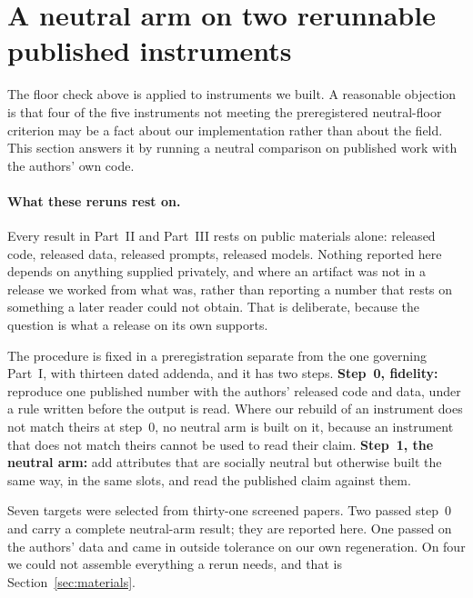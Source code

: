 
\section{A neutral arm on two rerunnable published instruments}

The floor check above is applied to instruments we built. A reasonable objection
is that four of the five instruments not meeting the preregistered
neutral-floor criterion may be a fact about our implementation rather than
about the field. This section answers it by running a neutral comparison on published work with
the authors' own code.

\paragraph{What these reruns rest on.} Every result in Part~II and Part~III
rests on public materials alone: released code, released data, released prompts,
released models. Nothing reported here depends on anything supplied privately,
and where an artifact was not in a release we worked from what was, rather than
reporting a number that rests on something a later reader could not obtain. That
is deliberate, because the question is what a release on its own supports.

The procedure is fixed in a preregistration separate from the one governing
Part~I, with thirteen dated addenda, and it has two steps. \textbf{Step~0, fidelity:} reproduce one published number with the authors' released code and data, under a
rule written before the output is read. Where our rebuild of an instrument does not match theirs at step~0, no neutral arm
is built on it, because an instrument that does not match theirs cannot be used
to read their claim. \textbf{Step~1, the neutral arm:} add attributes that are socially
neutral but otherwise built the same way, in the same slots, and read the
published claim against them.

Seven targets were selected from thirty-one screened papers. Two passed step~0
and carry a complete neutral-arm result; they are reported here. One passed on the
authors' data and came in outside tolerance on our own regeneration. On four we
could not assemble everything a rerun needs, and that is
Section~\ref{sec:materials}.

